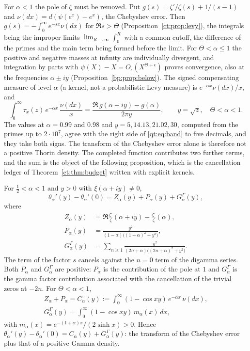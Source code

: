 For $\alpha<1$ the pole of $\zeta$ must be removed. Put $g(s)=\zeta'/\zeta(s)+1/(s-1)$ and $\nu(dx)=d(\psi(e^x)-e^x)$, the Chebyshev error. Then $g(s)=-\int_0^\infty e^{-sx}\nu(dx)$ for $\Re s>\Theta$ (Proposition~\ref{ct:prop:levy}), the integrals being the improper limits $\lim_{R\to\infty}\int_0^R$ with a common cutoff, the difference of the primes and the main term being formed before the limit. For $\Theta<\alpha\le1$ the positive and negative masses at infinity are individually divergent, and integration by parts with $\psi(X)-X=O_\epsilon(X^{\Theta+\epsilon})$ proves convergence, also at the frequencies $\alpha\pm iy$ (Proposition~\ref{bp:prop:below}). The signed compensating measure of level $\alpha$ (a kernel, not a probabilistic Levy measure) is $e^{-\alpha x}\nu(dx)/x$, and
\begin{equation}\label{qt:eq:band}
\int_0^\infty\tau_x(z)\,e^{-\alpha x}\,\frac{\nu(dx)}{x}=\frac{\Re\,g(\alpha+iy)-g(\alpha)}{2\pi y},\qquad y=\sqrt z,\quad\Theta<\alpha<1 .
\end{equation}
The values at $\alpha=0.99$ and $0.98$ and $y=5,14.13,21.02,30$, computed from the primes up to $2\cdot10^7$, agree with the right side of \eqref{qt:eq:band} to five decimals, and they take both signs. The transform of the Chebyshev error alone is therefore not a positive Thorin density. The completed function contributes two further terms, and the sum is the object of the following proposition, which is the cancellation ledger of Theorem~\ref{ct:thm:budget} written with explicit kernels.

\begin{proposition}\label{qt:prop:decomp}
For $\tfrac12<\alpha<1$ and $y>0$ with $\xi(\alpha+iy)\ne0$,
\[
\theta_\alpha'(y)-\theta_\alpha'(0)=Z_\alpha(y)+P_\alpha(y)+G^\Gamma_\alpha(y),
\]
where
\begin{align*}
Z_\alpha(y)&=\Re\frac{\zeta'}{\zeta}(\alpha+iy)-\frac{\zeta'}{\zeta}(\alpha),\\
P_\alpha(y)&=\frac{y^2}{(1-\alpha)\big((1-\alpha)^2+y^2\big)},\\
G^\Gamma_\alpha(y)&=\sum_{n\ge1}\frac{y^2}{(2n+\alpha)\big((2n+\alpha)^2+y^2\big)} .
\end{align*}
The term of the factor $s$ cancels against the $n=0$ term of the digamma series. Both $P_\alpha$ and $G^\Gamma_\alpha$ are positive: $P_\alpha$ is the contribution of the pole at $1$ and $G^\Gamma_\alpha$ is the gamma factor contribution associated with the cancellation of the trivial zeros at $-2n$. For $\Theta<\alpha<1$,
\begin{gather*}
Z_\alpha+P_\alpha=C_\alpha(y):=\int_0^\infty(1-\cos xy)\,e^{-\alpha x}\,\nu(dx),\\
G^\Gamma_\alpha(y)=\int_0^\infty(1-\cos xy)\,m_\alpha(x)\,dx,
\end{gather*}
with $m_\alpha(x)=e^{-(1+\alpha)x}/(2\sinh x)>0$. Hence $\theta_\alpha'(y)-\theta_\alpha'(0)=C_\alpha(y)+G^\Gamma_\alpha(y)$: the transform of the Chebyshev error plus that of a positive Gamma density.
\end{proposition}

